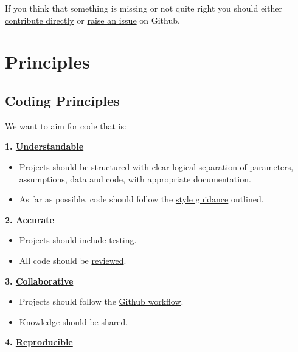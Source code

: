 \documentclass[]{book}
\providecommand{\tightlist}{%
  \setlength{\itemsep}{0pt}\setlength{\parskip}{0pt}}
\begin{document}
If you think that something is missing or not quite right you should either \protect\hyperlink{versioncontrol}{contribute directly} or \href{https://github.com/moj-analytical-services/our-coding-standards/issues}{raise an issue} on Github.

\hypertarget{part-principles}{%
\part{Principles}\label{part-principles}}

\hypertarget{principles}{%
\chapter*{Coding Principles}\label{principles}}

We want to aim for code that is:

\textbf{1. \protect\hyperlink{understand}{Understandable}}

\begin{itemize}
\tightlist
\item
  Projects should be \protect\hyperlink{structure2}{structured} with clear logical separation of parameters, assumptions, data and code, with appropriate documentation.
\item
  As far as possible, code should follow the \protect\hyperlink{style}{style guidance} outlined.
\end{itemize}

\textbf{2. \protect\hyperlink{accurate}{Accurate}}

\begin{itemize}
\tightlist
\item
  Projects should include \protect\hyperlink{unittest}{testing}.
\item
  All code should be \protect\hyperlink{review}{reviewed}.
\end{itemize}

\textbf{3. \protect\hyperlink{collaborate}{Collaborative}}

\begin{itemize}
\tightlist
\item
  Projects should follow the \protect\hyperlink{flow}{Github workflow}.
\item
  Knowledge should be \protect\hyperlink{knowledge}{shared}.
\end{itemize}

\textbf{4. \protect\hyperlink{reproduce}{Reproducible}}
\end{document}
